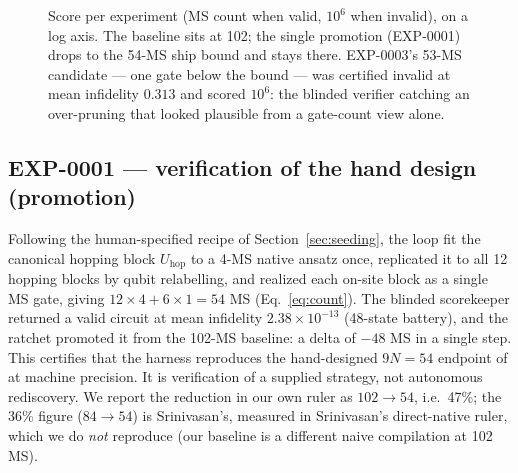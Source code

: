 \documentclass[11pt]{article}
\begin{document}
\begin{figure}[t]
\centering
{}
\caption{Score per experiment (MS count when valid, $10^{6}$ when invalid), on a log
axis. The baseline sits at 102; the single promotion (EXP-0001) drops to the 54-MS
ship bound and stays there. EXP-0003's 53-MS candidate --- one gate below the bound ---
was certified invalid at mean infidelity $0.313$ and scored $10^{6}$: the blinded
verifier catching an over-pruning that looked plausible from a gate-count view
alone.}
\label{fig:scores}
\end{figure}

\subsection{EXP-0001 --- verification of the hand design (promotion)}

Following the human-specified recipe of Section~\ref{sec:seeding}, the loop fit the
canonical hopping block $U_{\mathrm{hop}}$ to a 4-MS native ansatz once, replicated
it to all 12 hopping blocks by qubit relabelling, and realized each on-site block as
a single MS gate, giving $12\times4 + 6\times1 = 54$ MS
(Eq.~\eqref{eq:count}). The blinded scorekeeper returned a valid circuit at mean
infidelity $2.38\times10^{-13}$ (48-state battery), and the ratchet promoted it from
the 102-MS baseline: a delta of $-48$ MS in a single step. This certifies that the
harness reproduces the hand-designed $9N=54$ endpoint of \cite{Srinivasan2024} at
machine precision. It is verification of a supplied strategy, not autonomous
rediscovery. We report the reduction in our own ruler as $102\to54$, i.e.\ 47\%;
the 36\% figure ($84\to54$) is Srinivasan's, measured in Srinivasan's direct-native
ruler, which we do \emph{not} reproduce (our baseline is a different naive
compilation at 102 MS).
\end{document}
